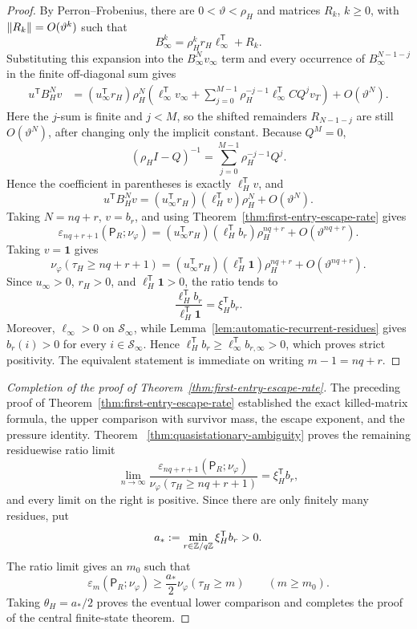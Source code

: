 \begin{proof}
By Perron--Frobenius, there are \(0<\vartheta<\rho_H\) and matrices
\(R_k\), \(k\geq0\), with \(\lVert R_k\rVert=O(\vartheta^k)\) such that
\[
  B_\infty^k
  = \rho_H^k r_H\ell_\infty^{\mathsf T}+R_k .
\]
Substituting this expansion into the \(B_\infty^N v_\infty\) term and
every occurrence of \(B_\infty^{N-1-j}\) in the finite off-diagonal sum
gives
\begin{align*}
  u^{\mathsf T}B_H^N v
  &=
    (u_\infty^{\mathsf T}r_H)\rho_H^N
    \left(
      \ell_\infty^{\mathsf T}v_\infty
      + \sum_{j=0}^{M-1}
          \rho_H^{-j-1}\ell_\infty^{\mathsf T}CQ^j v_T
    \right)
    + O(\vartheta^N).
\end{align*}
Here the \(j\)-sum is finite and \(j<M\), so the shifted remainders
\(R_{N-1-j}\) are still \(O(\vartheta^N)\), after changing only the
implicit constant.
Because \(Q^M=0\),
\[
  (\rho_H I-Q)^{-1}
  = \sum_{j=0}^{M-1}\rho_H^{-j-1}Q^j.
\]
Hence the coefficient in parentheses is exactly \(\ell_H^{\mathsf T}v\),
and
\[
  u^{\mathsf T}B_H^N v
  =
  (u_\infty^{\mathsf T}r_H)(\ell_H^{\mathsf T}v)\rho_H^N
  + O(\vartheta^N).
\]
Taking \(N=nq+r\), \(v=b_r\), and using
Theorem~\ref{thm:first-entry-escape-rate} gives
\[
  \varepsilon_{nq+r+1}(\mathsf P_R;\nu_\varphi)
  =
  (u_\infty^{\mathsf T}r_H)(\ell_H^{\mathsf T}b_r)\rho_H^{nq+r}
  + O(\vartheta^{nq+r}).
\]
Taking \(v=\mathbf 1\) gives
\[
  \nu_\varphi(\tau_H\ge nq+r+1)
  =
  (u_\infty^{\mathsf T}r_H)(\ell_H^{\mathsf T}\mathbf 1)\rho_H^{nq+r}
  + O(\vartheta^{nq+r}).
\]
Since \(u_\infty>0\), \(r_H>0\), and \(\ell_H^{\mathsf T}\mathbf 1>0\),
the ratio tends to
\[
  \frac{\ell_H^{\mathsf T}b_r}{\ell_H^{\mathsf T}\mathbf 1}
  = \xi_H^{\mathsf T}b_r.
\]
Moreover, \(\ell_\infty>0\) on \(\mathcal S_\infty\), while
Lemma~\ref{lem:automatic-recurrent-residues} gives
\(b_r(i)>0\) for every \(i\in\mathcal S_\infty\).  Hence
\(\ell_H^{\mathsf T}b_r\geq\ell_\infty^{\mathsf T}b_{r,\infty}>0\),
which proves strict positivity.
The equivalent statement is immediate on writing \(m-1=nq+r\).
\end{proof}

\begin{proof}[Completion of the proof of Theorem~\ref{thm:first-entry-escape-rate}]
The preceding proof of Theorem~\ref{thm:first-entry-escape-rate}
established the exact killed-matrix formula, the upper comparison with
survivor mass, the escape exponent, and the pressure identity.  Theorem
~\ref{thm:quasistationary-ambiguity} proves the remaining residuewise
ratio limit
\[
  \lim_{n\to\infty}
  \frac{\varepsilon_{nq+r+1}(\mathsf P_R;\nu_\varphi)}
       {\nu_\varphi(\tau_H\ge nq+r+1)}
  = \xi_H^{\mathsf T}b_r,
\]
and every limit on the right is positive.  Since there are only finitely
many residues, put
\[
  a_*:=\min_{r\in\mathbb{Z}/q\mathbb{Z}}\xi_H^{\mathsf T}b_r>0.
\]
The ratio limit gives an \(m_0\) such that
\[
  \varepsilon_m(\mathsf P_R;\nu_\varphi)
  \geq \frac{a_*}{2}\nu_\varphi(\tau_H\geq m)
  \qquad(m\geq m_0).
\]
Taking \(\theta_H=a_*/2\) proves the eventual lower comparison and
completes the proof of the central finite-state theorem.
\end{proof}

